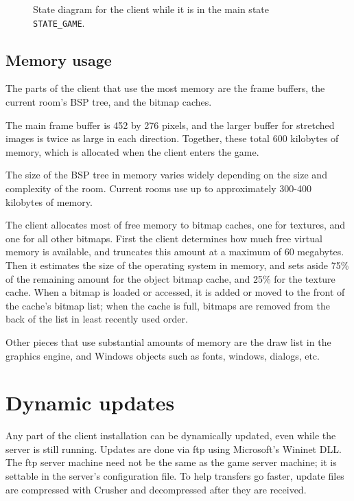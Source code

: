 \begin{figure}
\caption{State diagram for the client while it is in the main state
{\tt STATE\_GAME}.}
\label{fig:state2}
\end{figure}

\subsection{Memory usage}

The parts of the client that use the most memory are the frame
buffers, the current room's BSP tree, and the bitmap caches.

The main frame buffer is 452 by 276 pixels, and the larger buffer for
stretched images is twice as large in each direction.  Together, these
total 600 kilobytes of memory, which is allocated when the client
enters the game.

The size of the BSP tree in memory varies widely depending on the size
and complexity of the room.  Current rooms use up to approximately
300-400 kilobytes of memory.  

The client allocates most of free memory to bitmap caches, one for
textures, and one for all other bitmaps.  First the client determines
how much free virtual memory is available, and truncates this amount
at a maximum of 60 megabytes.  Then it estimates the size of the
operating system in memory, and sets aside 75\% of the remaining
amount for the object bitmap cache, and 25\% for the texture cache.
When a bitmap is loaded or accessed, it is added or moved to the front
of the cache's bitmap list; when the cache is full, bitmaps are
removed from the back of the list in least recently used order.

Other pieces that use substantial amounts of memory are the draw list
in the graphics engine, and Windows objects such as fonts, windows,
dialogs, etc.

\section{Dynamic updates}

Any part of the client installation can be dynamically updated, even
while the server is still running.  Updates are done via ftp using
Microsoft's Wininet DLL.  The ftp server machine need not be the same
as the game server machine; it is settable in the server's
configuration file.  To help transfers go faster, update files are
compressed with Crusher and decompressed after they are received.

